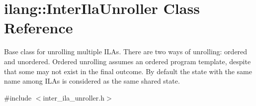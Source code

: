 \hypertarget{classilang_1_1_inter_ila_unroller}{}\section{ilang\+:\+:Inter\+Ila\+Unroller Class Reference}
\label{classilang_1_1_inter_ila_unroller}


Base class for unrolling multiple I\+L\+As. There are two ways of unrolling\+: ordered and unordered. Ordered unrolling assumes an ordered program template, despite that some may not exist in the final outcome. By default the state with the same name among I\+L\+As is considered as the same shared state.  




{\ttfamily \#include $<$inter\+\_\+ila\+\_\+unroller.\+h$>$}

